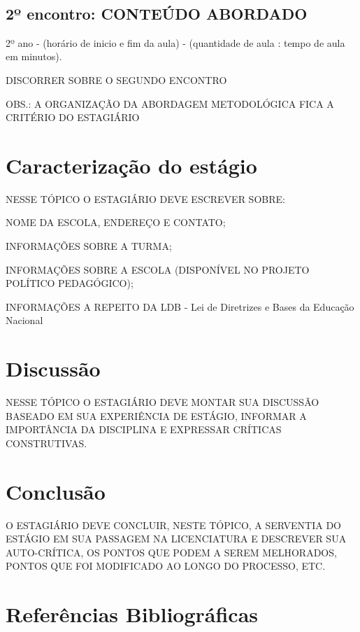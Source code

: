 \documentclass[a4paper, 12 pt]{article}                                	%
\begin{document}
	\
	\subsection{2º encontro: CONTEÚDO ABORDADO} 2º ano - (horário de inicio e fim da aula) - (quantidade de aula : tempo de aula em minutos).
	
	DISCORRER SOBRE O SEGUNDO ENCONTRO 
	
	OBS.: A ORGANIZAÇÃO DA ABORDAGEM METODOLÓGICA FICA A CRITÉRIO DO ESTAGIÁRIO
	
	\newpage
	\section{Caracterização do estágio}
	
	NESSE TÓPICO O ESTAGIÁRIO DEVE ESCREVER SOBRE:
	
	NOME DA ESCOLA, ENDEREÇO E CONTATO;
	
	INFORMAÇÕES SOBRE A TURMA;
	
	INFORMAÇÕES SOBRE A ESCOLA (DISPONÍVEL NO PROJETO POLÍTICO PEDAGÓGICO);
	
	INFORMAÇÕES A REPEITO DA LDB - Lei de Diretrizes e Bases da Educação Nacional
	
	\newpage
	\section{Discussão}
	
	NESSE TÓPICO O ESTAGIÁRIO DEVE MONTAR SUA DISCUSSÃO BASEADO EM SUA EXPERIÊNCIA DE ESTÁGIO, INFORMAR A IMPORTÂNCIA DA DISCIPLINA E EXPRESSAR CRÍTICAS CONSTRUTIVAS.
	
	
	\newpage
	\section{Conclusão}
	
	O ESTAGIÁRIO DEVE CONCLUIR, NESTE TÓPICO, A SERVENTIA DO ESTÁGIO EM SUA PASSAGEM NA LICENCIATURA E DESCREVER SUA AUTO-CRÍTICA, OS PONTOS QUE PODEM A SEREM MELHORADOS, PONTOS QUE FOI MODIFICADO AO LONGO DO PROCESSO, ETC.
	
	
	\newpage
	\section{Referências Bibliográficas}   
	
	
\end{document}
